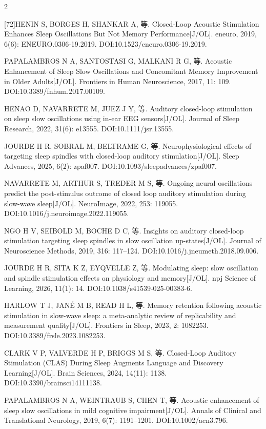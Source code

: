 \documentclass[UTF8,zihao=5,fontset=none]{ctexart}
\begin{document}
\begin{multicols}{2}
{[72]\quad HENIN S, BORGES H, SHANKAR A, 等. Closed-Loop Acoustic Stimulation Enhances Sleep Oscillations But Not Memory Performance[J/OL]. eneuro, 2019, 6(6): ENEURO.0306-19.2019. DOI:10.1523/eneuro.0306-19.2019.\par
[73]\quad PAPALAMBROS N A, SANTOSTASI G, MALKANI R G, 等. Acoustic Enhancement of Sleep Slow Oscillations and Concomitant Memory Improvement in Older Adults[J/OL]. Frontiers in Human Neuroscience, 2017, 11: 109. DOI:10.3389/fnhum.2017.00109.\par
[74]\quad HENAO D, NAVARRETE M, JUEZ J Y, 等. Auditory closed-loop stimulation on sleep slow oscillations using in-ear EEG sensors[J/OL]. Journal of Sleep Research, 2022, 31(6): e13555. DOI:10.1111/jsr.13555.\par
[75]\quad JOURDE H R, SOBRAL M, BELTRAME G, 等. Neurophysiological effects of targeting sleep spindles with closed-loop auditory stimulation[J/OL]. Sleep Advances, 2025, 6(2): zpaf007. DOI:10.1093/sleepadvances/zpaf007.\par
[76]\quad NAVARRETE M, ARTHUR S, TREDER M S, 等. Ongoing neural oscillations predict the post-stimulus outcome of closed loop auditory stimulation during slow-wave sleep[J/OL]. NeuroImage, 2022, 253: 119055. DOI:10.1016/j.neuroimage.2022.119055.\par
[77]\quad NGO H V, SEIBOLD M, BOCHE D C, 等. Insights on auditory closed-loop stimulation targeting sleep spindles in slow oscillation up-states[J/OL]. Journal of Neuroscience Methods, 2019, 316: 117--124. DOI:10.1016/j.jneumeth.2018.09.006.\par
[78]\quad JOURDE H R, SITA K Z, EYQVELLE Z, 等. Modulating sleep: slow oscillation and spindle stimulation effects on physiology and memory[J/OL]. npj Science of Learning, 2026, 11(1): 14. DOI:10.1038/s41539-025-00383-6.\par
[79]\quad HARLOW T J, JANÉ M B, READ H L, 等. Memory retention following acoustic stimulation in slow-wave sleep: a meta-analytic review of replicability and measurement quality[J/OL]. Frontiers in Sleep, 2023, 2: 1082253. DOI:10.3389/frsle.2023.1082253.\par
[80]\quad CLARK V P, VALVERDE H P, BRIGGS M S, 等. Closed-Loop Auditory Stimulation (CLAS) During Sleep Augments Language and Discovery Learning[J/OL]. Brain Sciences, 2024, 14(11): 1138. DOI:10.3390/brainsci14111138.\par
[81]\quad PAPALAMBROS N A, WEINTRAUB S, CHEN T, 等. Acoustic enhancement of sleep slow oscillations in mild cognitive impairment[J/OL]. Annals of Clinical and Translational Neurology, 2019, 6(7): 1191--1201. DOI:10.1002/acn3.796.\par
}
\end{multicols}
\end{document}
